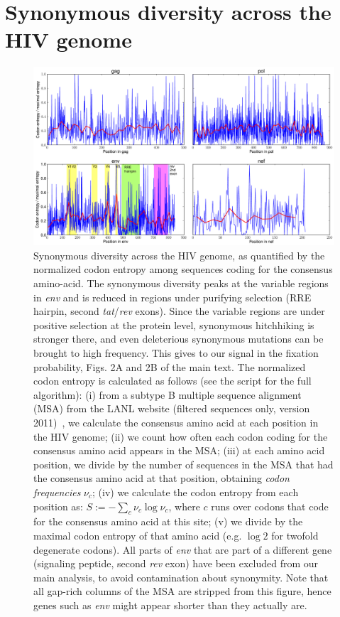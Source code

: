 \documentclass[rmp]{revtex4}
\begin{document}
\section{Synonymous diversity across the HIV genome}
\begin{figure}[h]
\begin{center}
\includegraphics[width=\linewidth]{conservation_codons_genome}
\caption{
Synonymous diversity across the HIV genome, as quantified by the normalized
codon entropy among sequences coding for the consensus amino-acid. The
synonymous diversity peaks at the variable regions in {\it env} and is reduced
in regions under purifying selection (RRE hairpin, second {\it tat}/{\it rev}
exons). Since the variable regions are under positive selection at the protein
level, synonymous hitchhiking is stronger there, and even deleterious synonymous
mutations can be brought to high frequency. This gives to our signal in the
fixation probability, Figs. 2A and 2B of the main text. The normalized codon
entropy is calculated as follows (see the script for the full algorithm): (i)
from a subtype B multiple sequence alignment (MSA) from the LANL website
(filtered sequences only, version 2011)~\cite{LANL2012}, we calculate the
consensus amino acid at each position in the HIV genome; (ii) we count how often
each codon coding for the consensus amino acid appears in the MSA; (iii) at each
amino acid position, we divide by the number of sequences in the MSA that had
the consensus amino acid at that position, obtaining {\it codon frequencies}
$\nu_c$; (iv) we calculate the codon entropy from each position as: $S := -
\sum_{c} \nu_c \log \nu_c$, where $c$ runs over codons that code for the
consensus amino acid at this site; (v) we divide by the maximal codon entropy of
that amino acid (e.g. $\log 2$ for twofold degenerate codons). All parts of
{\it env} that are part of a different gene (signaling peptide, second {\it rev}
exon) have been excluded from our main analysis, to avoid contamination about
synonymity. Note that all gap-rich columns of the MSA are stripped from this
figure, hence genes such as {\it env} might appear shorter than they actually
are.
}
\label{fig:syndiv_genome}
\end{center}
\end{figure}
\end{document}
